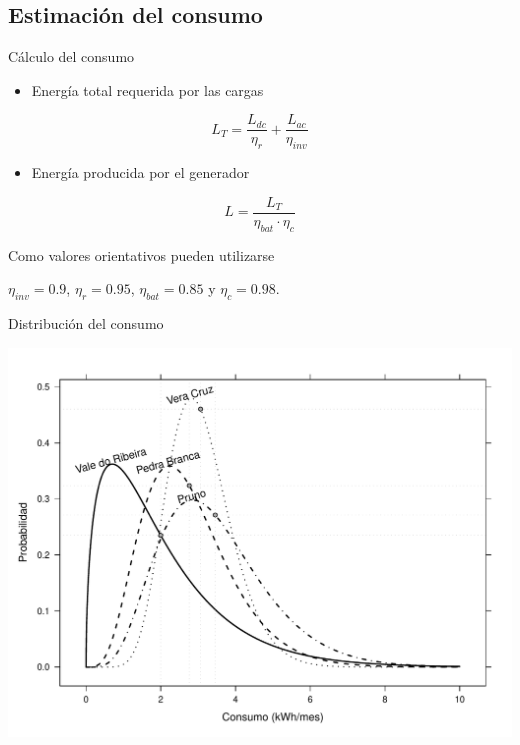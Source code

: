 \documentclass[xcolor={usenames,svgnames,dvipsnames}]{beamer}
\begin{document}
\subsection{Estimación del consumo}
\label{sec:org9ea9d8c}
\begin{frame}[label={sec:org20166e5}]{Cálculo del consumo}
\begin{itemize}
\item Energía total requerida por las cargas
\end{itemize}
$$L_{T}=\frac{L_{dc}}{\eta_{r}}+\frac{L_{ac}}{\eta_{inv}}$$

\begin{itemize}
\item Energía producida por el generador
\end{itemize}
$$L=\frac{L_{T}}{\eta_{bat}\cdot\eta_{c}}$$

Como valores orientativos pueden utilizarse

\(\eta_{inv}=0.9\), \(\eta_{r}=0.95\), \(\eta_{bat}=0.85\) y \(\eta_{c}=0.98\).
\end{frame}

\begin{frame}[label={sec:org7a6ad2c}]{Distribución del consumo}
\begin{center}
\includegraphics[width=.9\linewidth]{../figs/ConsumoGamma.pdf}
\end{center}
\end{frame}
\end{document}

